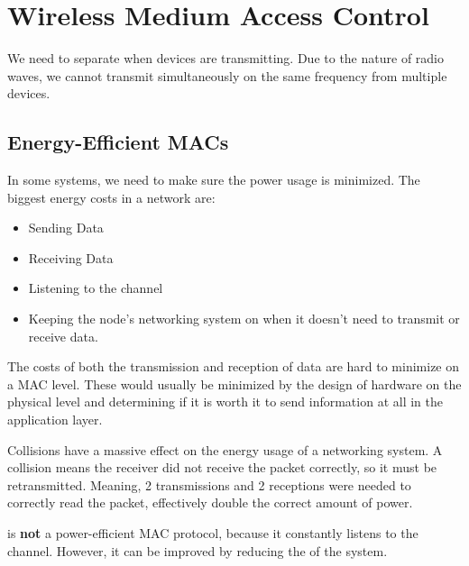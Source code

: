 \section{Wireless Medium Access Control}\label{sec:Wireless_MAC}
We need to separate when devices are transmitting.
Due to the nature of radio waves, we cannot transmit simultaneously on the same frequency from multiple devices.







\subsection{Energy-Efficient MACs}\label{subsec:Energy_Efficient_MACs}
In some systems, we need to make sure the power usage is minimized.
The biggest energy costs in a network are:
\begin{itemize}[noitemsep]
\item Sending Data
\item Receiving Data
\item Listening to the channel
\item Keeping the node's networking system on when it doesn't need to transmit or receive data.
\end{itemize}

\begin{remark*}
  The costs of both the transmission and reception of data are hard to minimize on a MAC level.
  These would usually be minimized by the design of hardware on the physical level and determining if it is worth it to send information at all in the application layer.
\end{remark*}

\begin{remark*}
  Collisions have a massive effect on the energy usage of a networking system.
  A collision means the receiver did not receive the packet correctly, so it must be retransmitted.
  Meaning, 2 transmissions and 2 receptions were needed to correctly read the packet, effectively double the correct amount of power.
\end{remark*}

\begin{remark*}
   is \textbf{not} a power-efficient MAC protocol, because it constantly listens to the channel.
  However, it can be improved by reducing the  of the system.
\end{remark*}

